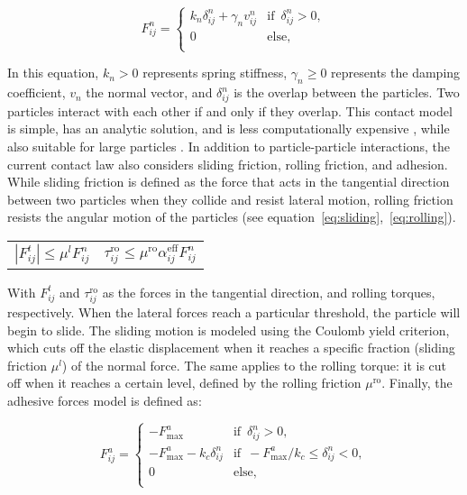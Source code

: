 \begin{equation}
 F_{ij}^n=\begin{cases}
 k_n \delta_{ij}^n + \gamma_n v_{ij}^n &\text{if } \, \delta_{ij}^n > 0, \\
 0 \quad &\text{else, } \, \\
 \end{cases}
\end{equation}

In this equation, $k_n > 0$ represents spring stiffness, $\gamma_n \geq 0$ represents the damping coefficient, $v_n$ the normal vector, and $\delta_{ij}^n$ is the overlap between the particles. Two particles interact with each other if and only if they overlap. This contact model is simple, has an analytic solution, and is less computationally expensive \cite{NAVARRO2013}, while also suitable for large particles \cite{MercuryDPM}. In addition to particle-particle interactions, the current contact law also considers sliding friction, rolling friction, and adhesion. While sliding friction is defined as the force that acts in the tangential direction between two particles when they collide and resist lateral motion, rolling friction resists the angular motion of the particles (see equation~\ref{eq:sliding},~\ref{eq:rolling}).


\noindent
\begin{tabularx}{\linewidth}{@{}XX@{}}
 \begin{equation} \label{eq:sliding}
 |F_{ij}^t| \leq \mu^lF_{ij}^n
 \end{equation}
 &
 \begin{equation}\label{eq:rolling}
 \tau_{ij}^{\text{ro}} \leq \mu^{\text{ro}} \alpha^{\text{eff}}_{ij} F_{ij}^n
 \end{equation}
\end{tabularx}

With $F_{ij}^t$ and $\tau_{ij}^{\text{ro}}$ as the forces in the tangential direction, and rolling torques, respectively. When the lateral forces reach a particular threshold, the particle will begin to slide. The sliding motion is modeled using the Coulomb yield criterion, which cuts off the elastic displacement when it reaches a specific fraction (sliding friction $\mu^l$) of the normal force. The same applies to the rolling torque: it is cut off when it reaches a certain level, defined by the rolling friction $\mu^{\text{ro}}$. Finally, the adhesive forces model is defined as: 

\begin{equation}
 F_{ij}^a=\begin{cases}
 -F^a_{\text{max}} &\text{if } \, \delta_{ij}^n > 0, \\
 -F^a_{\text{max}} - k_c \delta_{ij}^n &\text{if } \, -F^a_{\text{max}} / k_c \leq \delta_{ij}^n < 0, \\
 0 \quad &\text{else, } \, \\
 \end{cases}
\end{equation}

